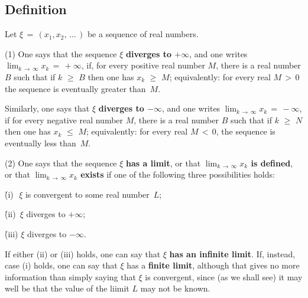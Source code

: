\V

           \subsection{\small{\bf Definition}}
            \label{DefC40.10}

        Let ${\xi} \,=\, (x_{1},x_{2},\,{\ldots}\,)$ be a sequence of real numbers.

\V

        (1) One says that the sequence ${\xi}$ {\bf diverges to $+{\infty}$},
    and one writes $\lim_{k \,{\rightarrow}\, {\infty}} x_{k} \,=\,+{\infty}$, if, for every positive real number $M$,
    there is a real number $B$ such that if $k\,\,{\geq}\,\,B$ then one has $x_{k}\,\,{\geq}\,\,M$;
    equivalently: for every real $M\,>\,0$ the sequence is eventually greater than~$M$.

        Similarly, one says that ${\xi}$ {\bf diverges to $-{\infty}$}, and one writes $\lim_{k \,{\rightarrow}\, {\infty}} x_{k} \,=\,-{\infty}$,
    if for every negative real number $M$, there is a real number $B$ such that if $k\,\,{\geq}\,\,N$ then one has $x_{k}\,\,{\leq}\,\,M$;
    equivalently: for every real $M\,<\,0$, the sequence is eventually less than~$M$.

\V

        (2) One says that the sequence ${\xi}$ {\bf has a limit}, or that {\bf $\lim_{k  \,{\rightarrow}\, {\infty}} x_{k}$ is defined},
    or that {\bf $\lim_{k  \,{\rightarrow}\, {\infty}} x_{k}$ exists} if one of the following three possibilities holds:

        \h (i)\,\, ${\xi}$ is convergent to some real number~$L$;

        \h (ii)\, ${\xi}$ diverges to $+{\infty}$;

        \h (iii) ${\xi}$ diverges to $-{\infty}$.

\noindent If either (ii) or (iii) holds, one can say that ${\xi}$ {\bf has an infinite limit}.
    If, instead, case (i) holds, one can say that ${\xi}$ has a {\bf finite limit},
    although that gives no more information than simply saying that ${\xi}$ is convergent, since (as we shall see) it may well be that the value of the liimit $L$ may not be known.

